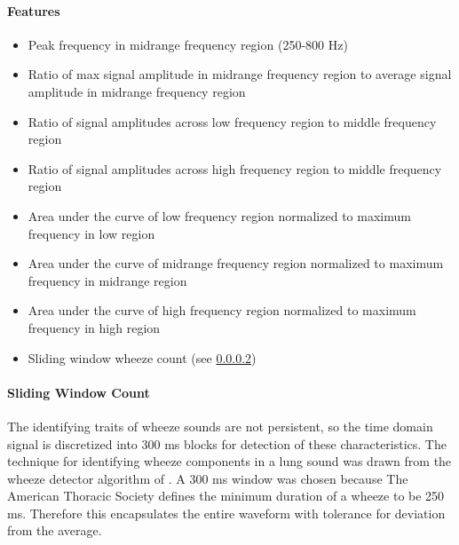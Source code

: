 \documentclass{article}
\begin{document}
\paragraph{Features}

\begin{itemize}[noitemsep,nolistsep]
\item
	Peak frequency in midrange frequency region (250-800 Hz)\\
\item
	Ratio of max signal amplitude in midrange frequency region to average signal amplitude in midrange frequency region\\
\item
	Ratio of signal amplitudes across low frequency region to middle frequency region\\
\item
	Ratio of signal amplitudes across high frequency region to middle frequency region\\
\item
	Area under the curve of low frequency region normalized to maximum frequency in low region\\
\item
	Area under the curve of midrange frequency region normalized to maximum frequency in midrange region\\
\item
	Area under the curve of high frequency region normalized to maximum frequency in high region\\
\item
	Sliding window wheeze count (see \ref{Wheeze Sliding Window})\\
\end{itemize}

\paragraph{Sliding Window Count}\label{Wheeze Sliding Window}

The identifying traits of wheeze sounds are not persistent, so the time domain signal is discretized into 300 ms blocks for detection of these characteristics. The technique for identifying wheeze components in a lung sound was drawn from the wheeze detector algorithm of \cite{Yi MEng}. A 300 ms window was chosen because The American Thoracic Society defines the minimum duration of a wheeze to be 250 ms. Therefore this encapsulates the entire waveform with tolerance for deviation from the average.\\
\end{document}
